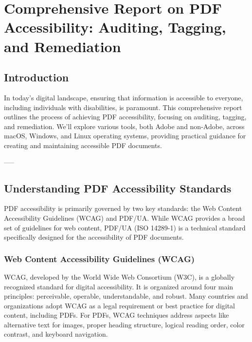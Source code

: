 \chapter{Comprehensive Report on PDF Accessibility: Auditing, Tagging, and Remediation}
\label{chap:pdf-accessibility}

\section{Introduction}
\label{sec:introduction}
In today's digital landscape, ensuring that information is accessible to everyone, including individuals with disabilities, is paramount. This comprehensive report outlines the process of achieving PDF accessibility, focusing on auditing, tagging, and remediation. We'll explore various tools, both Adobe and non-Adobe, across macOS, Windows, and Linux operating systems, providing practical guidance for creating and maintaining accessible PDF documents.

-----

\section{Understanding PDF Accessibility Standards}
\label{sec:pdf-accessibility-standards}
PDF accessibility is primarily governed by two key standards: the Web Content Accessibility Guidelines (WCAG) and PDF/UA. While WCAG provides a broad set of guidelines for web content, PDF/UA (ISO 14289-1) is a technical standard specifically designed for the accessibility of PDF documents.

\subsection{Web Content Accessibility Guidelines (WCAG)}
\label{subsec:wcag}
WCAG, developed by the World Wide Web Consortium (W3C), is a globally recognized standard for digital accessibility. It is organized around four main principles: perceivable, operable, understandable, and robust. Many countries and organizations adopt WCAG as a legal requirement or best practice for digital content, including PDFs.\cite{WCAG22} For PDFs, WCAG techniques address aspects like alternative text for images, proper heading structure, logical reading order, color contrast, and keyboard navigation.\cite{WCAG22Tech}

